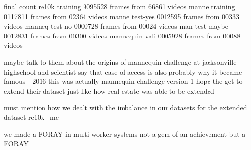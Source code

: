 final count 
re10k training 9095528 frames from 66861 videos 
manne training 0117811 frames from 02364 videos
manne test-yes 0012595 frames from 00333 videos
manneq test-no 0000728 frames from 00024 videos
man test-maybe 0012831 frames from 00300 videos
mannequin vali 0005928 frames from 00088 videos

maybe talk to them about the origins of mannequin challenge at jacksonville highschool and scientist say that ease of access is also probably why it became famous - 2016
this was actually mannequin challenge version 1 hope the get to extend their dataset just like how real estate was able to be extended



must mention how we dealt with the imbalance in our datasets for the extended dataset re10k+mc

we made a FORAY in multi worker systems not a gem of an achievement but a FORAY 

